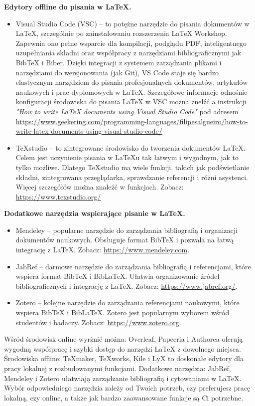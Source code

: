 \noindent \textbf{Edytory offline do pisania w LaTeX.}

\begin{itemize}
      \item Visual Studio Code (VSC) -- to potężne narzędzie do pisania dokumentów w LaTeX, szczególnie po zainstalowaniu rozszerzenia LaTeX Workshop. Zapewnia ono pełne wsparcie dla kompilacji, podglądu PDF, inteligentnego uzupełniania składni oraz współpracy z narzędziami bibliograficznymi jak BibTeX i Biber. Dzięki integracji z systemem zarządzania plikami i narzędziami do wersjonowania (jak Git), VS Code staje się bardzo elastycznym narzędziem do pisania profesjonalnych dokumentów, artykułów naukowych i prac dyplomowych w LaTeX. Szczegółowe informacje odnośnie konfiguracji środowiska do pisania LaTeX w VSC można znelźć a instrukcji \textit{"How to write LaTeX documents using Visual Studio Code"} pod adresem \url{https://www.geekering.com/programming-languages/filipesalgueiro/how-to-write-latex-documents-using-visual-studio-code/}
      \item TeXstudio -- to zintegrowane środowisko do tworzenia dokumentów LaTeX. Celem jest uczynienie pisania w LaTeXu tak łatwym i wygodnym, jak to tylko możliwe. Dlatego TeXstudio ma wiele funkcji, takich jak podświetlanie składni, zintegrowana przeglądarka, sprawdzanie referencji i różni asystenci. Więcej szczegółów można znaleźć w funkcjach. Zobacz: \url{https://www.texstudio.org/}
\end{itemize}

\noindent \textbf{Dodatkowe narzędzia wspierające pisanie w LaTeX.}
\begin{itemize}
      \item Mendeley -- popularne narzędzie do zarządzania bibliografią i organizacji dokumentów naukowych. Obsługuje format BibTeX i pozwala na łatwą integrację z LaTeX. Zobacz: \url{https://www.mendeley.com}.
      \item JabRef -- darmowe narzędzie do zarządzania bibliografią i referencjami, które wspiera format BibTeX i BibLaTeX. Ułatwia organizowanie źródeł bibliograficznych i integrację z LaTeX. Zobacz: \url{https://www.jabref.org/}.
      \item Zotero -- kolejne narzędzie do zarządzania referencjami naukowymi, które wspiera BibTeX i BibLaTeX. Zotero jest popularnym wyborem wśród studentów i badaczy. Zobacz: \url{https://www.zotero.org}.
\end{itemize}

Wśród środowisk online wyrżnić można: Overleaf, Papeeria i Authorea oferują wygodną współpracę i szybki dostęp do narzędzi LaTeX z dowolnego miejsca. Środowiska offline: TeXmaker, TeXworks, Kile i LyX to doskonałe edytory dla pracy lokalnej z rozbudowanymi funkcjami. Dodatkowe narzędzia: JabRef, Mendeley i Zotero ułatwiają zarządzanie bibliografią i cytowaniami w LaTeX. Wybór odpowiedniego narzędzia zależy od Twoich potrzeb, czy preferujesz pracę lokalną, czy online, a także jak bardzo zaawansowane funkcje są Ci potrzebne.

